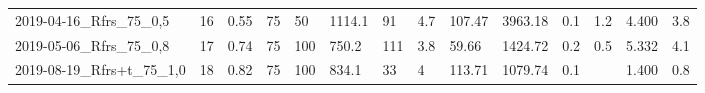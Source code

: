 \begin{tabular}{l l l l l l l l l l l l l}
2019-04-16\_Rfrs\_75\_0,5    &     16 &         0.55 &        75 &          50 &      1114.1 &   91 &      4.7 &  107.47 &      3963.18 &          0.1 &               1.2 &      4.400 &           3.8 \\
2019-05-06\_Rfrs\_75\_0,8    &     17 &         0.74 &        75 &         100 &       750.2 &  111 &      3.8 &   59.66 &      1424.72 &          0.2 &               0.5 &      5.332 &           4.1 \\
2019-08-19\_Rfrs+t\_75\_1,0  &     18 &         0.82 &        75 &         100 &       834.1 &   33 &        4 &  113.71 &      1079.74 &          0.1 &                   &      1.400 &           0.8 \\
\bottomrule
\end{tabular}
